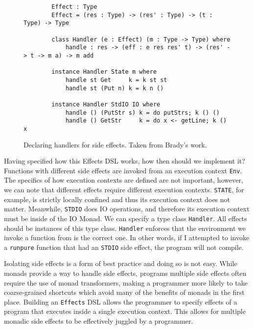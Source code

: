 \begin{figure}[ht!!!!]
    \caption{Declaring handlers for side effects. Taken from Brady's work.
    \protect\cite{algebraic}}
    \label{handlers}
    \begin{lstlisting}
        Effect : Type
        Effect = (res : Type) -> (res' : Type) -> (t : Type) -> Type

        class Handler (e : Effect) (m : Type -> Type) where
            handle : res -> (eff : e res res' t) -> (res' -> t -> m a) -> m add
        
        instance Handler State m where
            handle st Get     k = k st st
            handle st (Put n) k = k n ()
        
        instance Handler StdIO IO where
            handle () (PutStr s) k = do putStrs; k () ()
            handle () GetStr     k = do x <- getLine; k () x
    \end{lstlisting}
\end{figure}

Having specified how this Effects DSL works, how then should we implement it?
Functions with different side effects are invoked from an execution context
\texttt{Env}. The specifics of how execution contexts are defined are not
important, however, we can note that different effects require different
execution contexts. \texttt{STATE}, for example, is strictly locally confined
and thus its execution context does not matter. Meanwhile, \texttt{STDIO} does
IO operations, and therefore its execution context must be inside of the IO
Monad. We can specify a type class \texttt{Handler}. All effects should be
instances of this type class. \texttt{Handler} enforces that the environment we
invoke a function from is the correct one. In other words, if I attempted to
invoke a \texttt{runpure} function that had an \texttt{STDIO} side effect, the
program will not compile. 

Isolating side effects is a form of best practice and doing so is not easy.
While monads provide a way to handle side effects, programs multiple side
effects often require the use of monad transformers, making a programmer more
likely to take coarse-grained shortcuts which avoid many of the benefits of
monads in the first place. Building an \texttt{Effects} DSL allows the
programmer to specify effects of a program that executes inside a single
execution context. This allows for multiple monadic side effects to be
effectively juggled by a programmer. 